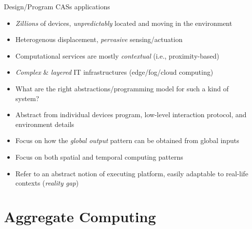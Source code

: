 \documentclass[8pt, aspectratio=169, handout]{beamer}
\begin{document}
\begin{frame}{Design/Program CASs applications}
  \begin{alarm}
    \begin{itemize}
      \item \emph{Zillions} of devices, \emph{unpredictably} located and moving in the environment
      \item Heterogenous displacement, \emph{pervasive} sensing/actuation
      \item Computational services are mostly \emph{contextual} (i.e., proximity-based)
      \item \emph{Complex} \& \emph{layered} IT infrastructures (edge/fog/cloud computing)
      \item[\faArrowRight] What are the right abstractions/programming model for such a kind of system?
    \end{itemize}
  \end{alarm}
  \begin{card}
    \begin{itemize}
      \item[\faThumbsUp] Abstract from individual devices program, low-level interaction protocol, and environment details
      \item[\faThumbsUp] Focus on how the \emph{global output} pattern can be obtained from global
      inputs
      \item[\faThumbsUp] Focus on both spatial and temporal computing patterns
      \item[\faThumbsUp] Refer to an abstract notion of executing platform, easily adaptable to
      real-life contexts (\emph{reality gap}) 
    \end{itemize}
  \end{card}
\end{frame}
\section{Aggregate Computing}
\end{document}

